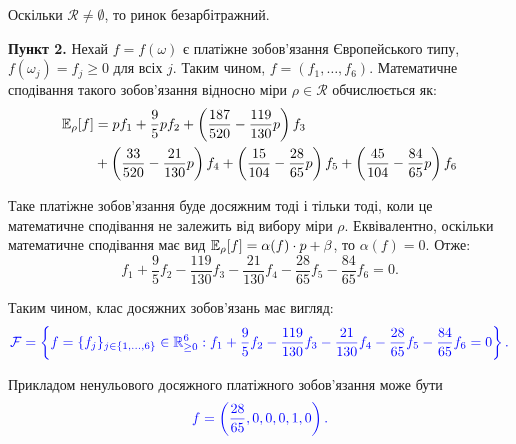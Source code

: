 \documentclass{test_template}
\begin{document}
Оскільки $\mathcal{R} \neq \emptyset$, то ринок безарбітражний.

\textbf{Пункт 2.} Нехай $f=f(\omega)$ є платіжне зобов'язання Європейського
типу, $f(\omega_j)=f_j \geq 0$ для всіх $j$. Таким чином,
$f=(f_1,\dots,f_6)$. Математичне сподівання такого зобов'язання
відносно міри $\rho \in \mathcal{R}$ обчислюється як:
\begin{align*}
    \small\mathbb{E}_{\rho}[f] &= pf_1 + \frac{9}{5}pf_2 + \left(\frac{187}{520}-\frac{119}{130}p\right)f_3 \\
    &+ \left(\frac{33}{520} - \frac{21}{130}p\right)f_4 + \left(\frac{15}{104}-\frac{28}{65}p\right)f_5 + \left(\frac{45}{104}-\frac{84}{65}p\right)f_6
\end{align*}

Таке платіжне зобов'язання буде досяжним тоді і тільки тоді, коли це математичне
сподівання не залежить від вибору міри $\rho$. Еквівалентно, оскільки
математичне сподівання має вид $\small\mathbb{E}_{\rho}[f]=\alpha(f) \cdot
p+\beta$, то $\alpha(f)=0$. Отже:
\begin{equation*}
    f_1 + \frac{9}{5}f_2 - \frac{119}{130}f_3 - \frac{21}{130}f_4 - \frac{28}{65}f_5 - \frac{84}{65}f_6 = 0.
\end{equation*}

Таким чином, клас досяжних зобов'язань має вигляд:
\begin{equation*}
    \textcolor{blue}{\mathcal{F} = \left\{ f=\{f_j\}_{j \in \{1,\dots,6\}} \in \mathbb{R}_{\geq 0}^6: f_1 + \frac{9}{5}f_2 - \frac{119}{130}f_3 - \frac{21}{130}f_4 - \frac{28}{65}f_5 - \frac{84}{65}f_6 = 0\right\}.}
\end{equation*}

Прикладом ненульового досяжного платіжного зобов'язання може бути
\begin{equation*}
    \textcolor{blue}{f = \left(\frac{28}{65}, 0, 0, 0, 1, 0\right).}
\end{equation*}
\end{document}
